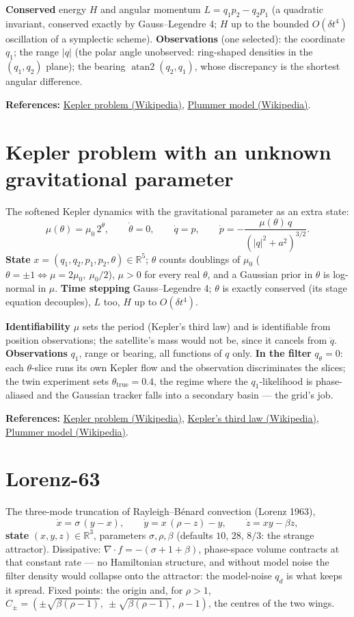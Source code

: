 \documentclass[11pt,a4paper]{article}
\newcommand{\modelsection}[2]{\clearpage\hypertarget{#1}{}\section{#2}\label{model:#1}}
\begin{document}
\textbf{Conserved} energy $H$ and angular momentum $L=q_1p_2-q_2p_1$ (a quadratic invariant, conserved exactly by Gauss--Legendre 4; $H$ up to the bounded $O(\delta t^4)$ oscillation of a symplectic scheme). \textbf{Observations} (one selected): the coordinate $q_1$; the range $|q|$ (the polar angle unobserved: ring-shaped densities in the $(q_1,q_2)$ plane); the bearing $\operatorname{atan2}(q_2,q_1)$, whose discrepancy is the shortest angular difference.

\textbf{References:} \href{https://en.wikipedia.org/wiki/Kepler_problem}{Kepler problem (Wikipedia)}, \href{https://en.wikipedia.org/wiki/Plummer_model}{Plummer model (Wikipedia)}.

\modelsection{kepler_mu}{Kepler problem with an unknown gravitational parameter}
The softened Kepler dynamics with the gravitational parameter as an extra state:
\[
  \mu(\theta)=\mu_0\,2^{\theta}, \qquad \dot\theta=0, \qquad
  \dot q=p, \qquad \dot p=-\frac{\mu(\theta)\,q}{(|q|^2+a^2)^{3/2}} .
\]
\textbf{State} $x=(q_1,q_2,p_1,p_2,\theta)\in\mathbb R^5$; $\theta$ counts doublings of $\mu_0$ ($\theta=\pm1\Leftrightarrow\mu=2\mu_0,\ \mu_0/2$), $\mu>0$ for every real $\theta$, and a Gaussian prior in $\theta$ is log-normal in $\mu$. \textbf{Time stepping} Gauss--Legendre 4; $\theta$ is exactly conserved (its stage equation decouples), $L$ too, $H$ up to $O(\delta t^4)$.

\textbf{Identifiability} $\mu$ sets the period (Kepler's third law) and is identifiable from position observations; the satellite's mass would not be, since it cancels from $\ddot q$. \textbf{Observations} $q_1$, range or bearing, all functions of $q$ only. \textbf{In the filter} $q_\theta=0$: each $\theta$-slice runs its own Kepler flow and the observation discriminates the slices; the twin experiment sets $\theta_{\text{true}}=0.4$, the regime where the $q_1$-likelihood is phase-aliased and the Gaussian tracker falls into a secondary basin — the grid's job.

\textbf{References:} \href{https://en.wikipedia.org/wiki/Kepler_problem}{Kepler problem (Wikipedia)}, \href{https://en.wikipedia.org/wiki/Kepler\%27s_laws_of_planetary_motion}{Kepler's third law (Wikipedia)}, \href{https://en.wikipedia.org/wiki/Plummer_model}{Plummer model (Wikipedia)}.

\modelsection{lorenz}{Lorenz-63}
The three-mode truncation of Rayleigh--B\'enard convection (Lorenz 1963),
\[
  \dot x=\sigma\,(y-x), \qquad \dot y=x\,(\rho-z)-y, \qquad \dot z=xy-\beta z ,
\]
\textbf{state} $(x,y,z)\in\mathbb R^3$, parameters $\sigma,\rho,\beta$ (defaults $10$, $28$, $8/3$: the strange attractor). Dissipative: $\nabla\!\cdot\!f=-(\sigma+1+\beta)$, phase-space volume contracts at that constant rate — no Hamiltonian structure, and without model noise the filter density would collapse onto the attractor: the model-noise $q_d$ is what keeps it spread. Fixed points: the origin and, for $\rho>1$, $C_\pm=(\pm\sqrt{\beta(\rho-1)},\ \pm\sqrt{\beta(\rho-1)},\ \rho-1)$, the centres of the two wings.
\end{document}

